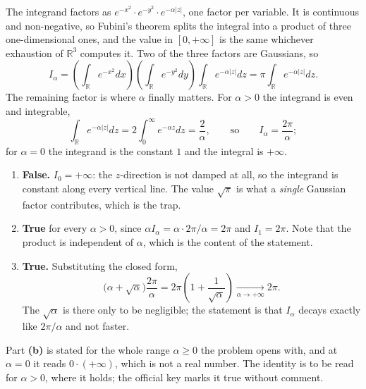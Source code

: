\begin{exercisesolution}
\label{sol:gaussian_slab_alpha_asymptotics}
The integrand factors as $e^{-x^2}\cdot e^{-y^2}\cdot e^{-\alpha\lvert z\rvert}$, one factor per
variable. It is continuous and non-negative, so Fubini's theorem splits the integral into a
product of three one-dimensional ones, and the value in $[0,+\infty]$ is the same whichever
exhaustion of $\mathbb{R}^3$ computes it. Two of the three factors are Gaussians, so
\[I_\alpha = \left(\int_{\mathbb{R}} e^{-x^2}dx\right)
  \left(\int_{\mathbb{R}} e^{-y^2}dy\right)
  \int_{\mathbb{R}} e^{-\alpha\lvert z\rvert}dz
  = \pi \int_{\mathbb{R}} e^{-\alpha\lvert z\rvert}dz .\]
The remaining factor is where $\alpha$ finally matters. For $\alpha > 0$ the integrand is even
and integrable,
\[\int_{\mathbb{R}} e^{-\alpha\lvert z\rvert}dz = 2\int_0^\infty e^{-\alpha z}dz = \frac{2}{\alpha},
  \qquad\text{so}\qquad I_\alpha = \frac{2\pi}{\alpha};\]
for $\alpha = 0$ the integrand is the constant $1$ and the integral is $+\infty$.
\begin{enumerate}[label=\textbf{(\alph*)}]
  \item \textbf{False.} $I_0 = +\infty$: the $z$-direction is not damped at all, so the integrand
    is constant along every vertical line. The value $\sqrt{\pi}$ is what a \emph{single} Gaussian
    factor contributes, which is the trap.
  \item \textbf{True} for every $\alpha > 0$, since $\alpha I_\alpha = \alpha\cdot 2\pi/\alpha =
    2\pi$ and $I_1 = 2\pi$. Note that the product is independent of $\alpha$, which is the
    content of the statement.
  \item \textbf{True.} Substituting the closed form,
    \[\big(\alpha+\sqrt{\alpha}\big)\frac{2\pi}{\alpha}
      = 2\pi\left(1 + \frac{1}{\sqrt\alpha}\right) \xrightarrow[\alpha\to+\infty]{} 2\pi .\]
    The $\sqrt\alpha$ is there only to be negligible; the statement is that $I_\alpha$ decays
    exactly like $2\pi/\alpha$ and not faster.
\end{enumerate}

\begin{ainote}
Part \textbf{(b)} is stated for the whole range $\alpha \geq 0$ the problem opens with, and at
$\alpha = 0$ it reads $0\cdot(+\infty)$, which is not a real number. The identity is to be read
for $\alpha > 0$, where it holds; the official key marks it true without comment.
\end{ainote}
\end{exercisesolution}

